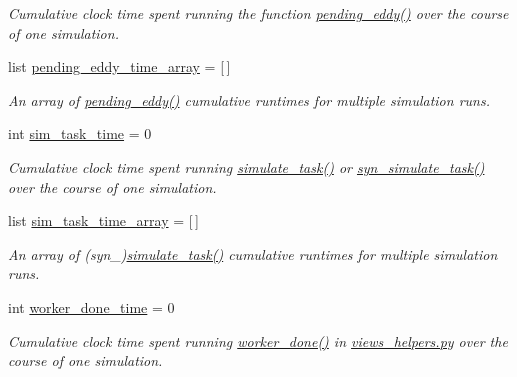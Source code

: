 \begin{DoxyCompactItemize}
\begin{DoxyCompactList}\small\item\em Cumulative clock time spent running the function \mbox{\hyperlink{namespacedynamicfilterapp_1_1views__helpers_a997e8cb3795ce79c24f95bec20063b13}{pending\+\_\+eddy()}} over the course of one simulation. \end{DoxyCompactList}\item 
list \mbox{\hyperlink{classdynamicfilterapp_1_1test__simulations_1_1_simulation_test_a52b2537908d48417dca35915eadfad89}{pending\+\_\+eddy\+\_\+time\+\_\+array}} = \mbox{[}$\,$\mbox{]}
\begin{DoxyCompactList}\small\item\em An array of \mbox{\hyperlink{namespacedynamicfilterapp_1_1views__helpers_a997e8cb3795ce79c24f95bec20063b13}{pending\+\_\+eddy()}} cumulative runtimes for multiple simulation runs. \end{DoxyCompactList}\item 
int \mbox{\hyperlink{classdynamicfilterapp_1_1test__simulations_1_1_simulation_test_ab7d456049efdc5d9da3fd20938f5aa1c}{sim\+\_\+task\+\_\+time}} = 0
\begin{DoxyCompactList}\small\item\em Cumulative clock time spent running \mbox{\hyperlink{classdynamicfilterapp_1_1test__simulations_1_1_simulation_test_a99876860db527a8dd4dbc844f453e572}{simulate\+\_\+task()}} or \mbox{\hyperlink{classdynamicfilterapp_1_1test__simulations_1_1_simulation_test_a652b503c9374430264cac65df6c59eee}{syn\+\_\+simulate\+\_\+task()}} over the course of one simulation. \end{DoxyCompactList}\item 
list \mbox{\hyperlink{classdynamicfilterapp_1_1test__simulations_1_1_simulation_test_a0cb38299204269a784337186882a99e3}{sim\+\_\+task\+\_\+time\+\_\+array}} = \mbox{[}$\,$\mbox{]}
\begin{DoxyCompactList}\small\item\em An array of (syn\+\_\+)\mbox{\hyperlink{classdynamicfilterapp_1_1test__simulations_1_1_simulation_test_a99876860db527a8dd4dbc844f453e572}{simulate\+\_\+task()}} cumulative runtimes for multiple simulation runs. \end{DoxyCompactList}\item 
int \mbox{\hyperlink{classdynamicfilterapp_1_1test__simulations_1_1_simulation_test_ab6da582941b08e9341e17555b8862fbd}{worker\+\_\+done\+\_\+time}} = 0
\begin{DoxyCompactList}\small\item\em Cumulative clock time spent running \mbox{\hyperlink{namespacedynamicfilterapp_1_1views__helpers_af27860dfe5bfa6b2b8a1b29347eb918d}{worker\+\_\+done()}} in \mbox{\hyperlink{views__helpers_8py}{views\+\_\+helpers.\+py}} over the course of one simulation. \end{DoxyCompactList}\item 

\end{DoxyCompactItemize}
